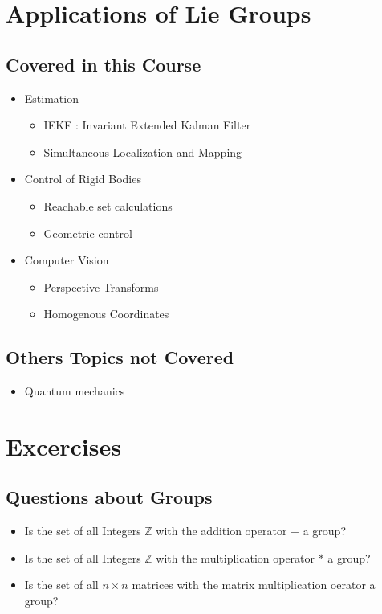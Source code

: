 \documentclass{book}
\begin{document}
\section{Applications of Lie Groups}

\subsection*{Covered in this Course}
\begin{itemize}
    \item Estimation
        \begin{itemize}
            \item IEKF : Invariant Extended Kalman Filter
            \item Simultaneous Localization and Mapping
        \end{itemize}
    \item Control of Rigid Bodies
        \begin{itemize}
            \item Reachable set calculations
            \item Geometric control
        \end{itemize}
    \item Computer Vision
    \begin{itemize}
        \item Perspective Transforms
        \item Homogenous Coordinates
    \end{itemize}
\end{itemize}


\subsection*{Others Topics not Covered}
\begin{itemize}
    \item Quantum mechanics
\end{itemize}


\section*{Excercises}

\subsection*{Questions about Groups}

\begin{itemize}
    \item Is the set of all Integers $\mathbb{Z}$ with the addition operator $+$ a group?
    \item Is the set of all Integers $\mathbb{Z}$ with the multiplication operator $*$ a group?
    \item Is the set of all $n\times n$ matrices with the matrix multiplication oerator a group?
\end{itemize}
\end{document}
